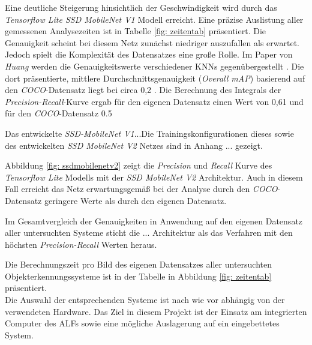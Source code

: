 

Eine deutliche Steigerung hinsichtlich der Geschwindigkeit wird durch das \textit{Tensorflow Lite SSD MobileNet V1} Modell erreicht. Eine präzise Auslistung aller gemessenen Analysezeiten ist in Tabelle \ref{fig: zeitentab} präsentiert. Die Genauigkeit scheint bei diesem Netz zunächst niedriger auszufallen als erwartet. Jedoch spielt die Komplexität des Datensatzes eine große Rolle. Im Paper von \textit{Huang} werden die Genauigkeitswerte verschiedener KNNs gegenübergestellt \cite{maxssdmobilenet}. Die dort präsentierte, mittlere Durchschnittsgenauigkeit (\textit{Overall mAP}) basierend auf den \textit{COCO}-Datensatz liegt bei circa 0,2 \cite{maxssdmobilenet}. Die Berechnung des Integrals der \textit{Precision-Recall}-Kurve ergab für den eigenen Datensatz einen Wert von 0,61 und für den \textit{COCO}-Datensatz 0.5



Das entwickelte \textit{SSD-MobileNet V1}...Die Trainingskonfigurationen dieses sowie des entwickelten \textit{SSD MobileNet V2} Netzes sind in Anhang ... gezeigt.



Abbildung \ref{fig: ssdmobilenetv2} zeigt die \textit{Precision} und \textit{Recall} Kurve des \textit{Tensorflow Lite} Modells mit der \textit{SSD MobileNet V2} Architektur. Auch in diesem Fall erreicht das Netz erwartungsgemäß bei der Analyse durch den \textit{COCO}-Datensatz geringere Werte als durch den eigenen Datensatz. 

   



Im Gesamtvergleich der Genauigkeiten in Anwendung auf den eigenen Datensatz aller untersuchten Systeme sticht die ... Architektur als das Verfahren mit den höchsten \textit{Precision-Recall} Werten heraus. 



Die Berechnungszeit pro Bild des eigenen Datensatzes aller untersuchten Objekterkennungssysteme ist in der Tabelle in Abbildung \ref{fig: zeitentab} präsentiert.  \\

Die Auswahl der entsprechenden Systeme ist nach wie vor abhängig von der verwendeten Hardware. Das Ziel in diesem Projekt ist der Einsatz am integrierten Computer des ALFs sowie eine mögliche Auslagerung auf ein eingebettetes System. 



